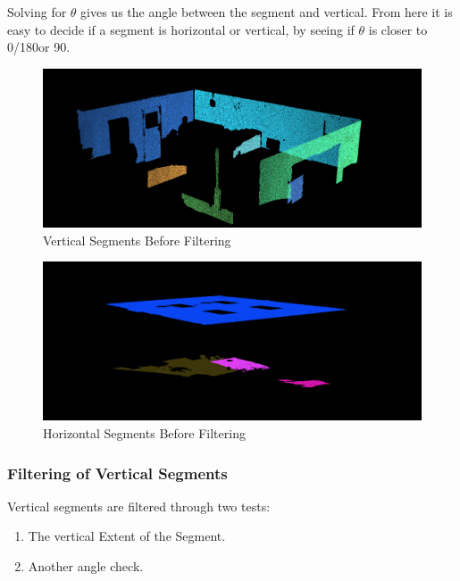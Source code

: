 			
			Solving for $\theta$ gives us the angle between the segment and vertical. From here it is easy to decide if a segment is horizontal or vertical, by seeing if $\theta$ is closer to 0\textdegree/180\textdegree or 90\textdegree.
			
			\begin{figure}[H]
				\centering
				\includegraphics[width=1\linewidth]{"Includes/images/SEG Select/CutDown-Vert"}
				\caption{Vertical Segments Before Filtering}
				\label{fig:CutDown-Vert}
			\end{figure}
			
			\begin{figure}[H]
				\centering
				\includegraphics[width=1\linewidth]{"Includes/images/SEG Select/CutDown-HOR"}
				\caption{Horizontal Segments Before Filtering}
				\label{fig:CutDown-HOR}
			\end{figure}
			
		\subsubsection{Filtering of Vertical Segments}
		
			Vertical segments are filtered through two tests:
			\begin{enumerate}
				\item The vertical Extent of the Segment.
				
				\item Another angle check.
			\end{enumerate}
			 
